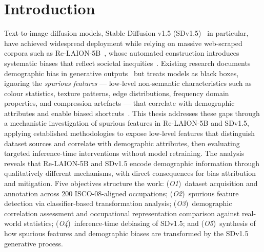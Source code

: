 \chapter{Introduction}

Text-to-image diffusion models, Stable Diffusion v1.5 (SDv1.5)~\cite{Rombach_2022_CVPR}
in particular, have achieved widespread deployment while relying on massive web-scraped
corpora such as Re-LAION-5B~\cite{Schuhmann_2022_Laion5b}, whose automated construction
introduces systematic biases that reflect societal
inequities~\cite{Birhane_2021_MultiModalDatasetsMisogynyPornography}. Existing research
documents demographic bias in generative
outputs~\cite{Luccioni_2023_AnalyzingSocietalRepresentationsDiffusionModels,
    Bianchi_2023_TTIGenAmplifiesDemographicStereotypes} but treats models as black boxes,
ignoring the \emph{spurious features} — low-level non-semantic characteristics such as
colour statistics, texture patterns, edge distributions, frequency domain properties, and
compression artefacts — that correlate with demographic attributes and enable biased
shortcuts~\cite{Meister_2023_GenderArtifactsinVisualDatasets,
    Zeng_2024_UnderstandingBiasinLargeScaleVisualDatasets}. This thesis addresses these gaps
through a mechanistic investigation of spurious features in Re-LAION-5B and SDv1.5,
applying established methodologies to expose low-level features that distinguish dataset
sources and correlate with demographic attributes, then evaluating targeted
inference-time interventions without model retraining. The analysis reveals that
Re-LAION-5B and SDv1.5 encode demographic information through qualitatively different
mechanisms, with direct consequences for bias attribution and mitigation. Five objectives
structure the work: (\textit{O1})~dataset acquisition and annotation across 200
ISCO-08-aligned occupations; (\textit{O2})~spurious feature detection via classifier-based
transformation analysis; (\textit{O3})~demographic correlation assessment and
occupational representation comparison against real-world statistics;
(\textit{O4})~inference-time debiasing of SDv1.5; and (\textit{O5})~synthesis of how
spurious features and demographic biases are transformed by the SDv1.5 generative
process.



